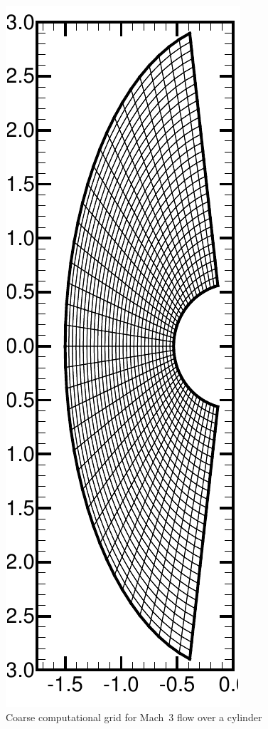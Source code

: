 \begin{figure}[hbtp]
  \begin{center}
    \includegraphics[height=0.8\textheight]{figures/mach3_cylinder/grid_30x40}
    \caption{Coarse computational grid for Mach~3 flow over a cylinder\label{fig:cyl_grid_30x40}}
  \end{center}
\end{figure}


